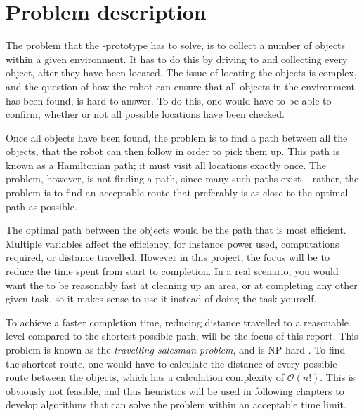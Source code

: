 \section{Problem description} \label{sec:problem-description}

The problem that the \projname{}-prototype has to solve, is to collect a number of objects within a given environment. It has to do this by driving to and collecting every object, after they have been located. The issue of locating the objects is complex, and the question of how the robot can ensure that all objects in the environment has been found, is hard to answer. To do this, one would have to be able to confirm, whether or not all possible locations have been checked.

Once all objects have been found, the problem is to find a path between all the objects, that the robot can then follow in order to pick them up. This path is known as a Hamiltonian path; it must visit all locations exactly once. The problem, however, is not finding a path, since many such paths exist -- rather, the problem is to find an acceptable route that preferably is as close to the optimal path as possible.

The optimal path between the objects would be the path that is most efficient. Multiple variables affect the efficiency, for instance power used, computations required, or distance travelled. However in this project, the focus will be to reduce the time spent from start to completion. In a real scenario, you would want the \projname{} to be reasonably fast at cleaning up an area, or at completing any other given task, so it makes sense to use it instead of doing the task yourself.

To achieve a faster completion time, reducing distance travelled to a reasonable level compared to the shortest possible path, will be the focus of this report. This problem is known as the \emph{travelling salesman problem}, and is NP-hard \citep{tsp}. To find the shortest route, one would have to calculate the distance of every possible route between the objects, which has a calculation complexity of $\mathcal{O}(n!)$. This is obviously not feasible, and thus heuristics will be used in following chapters to develop algorithms that can solve the problem within an acceptable time limit.


